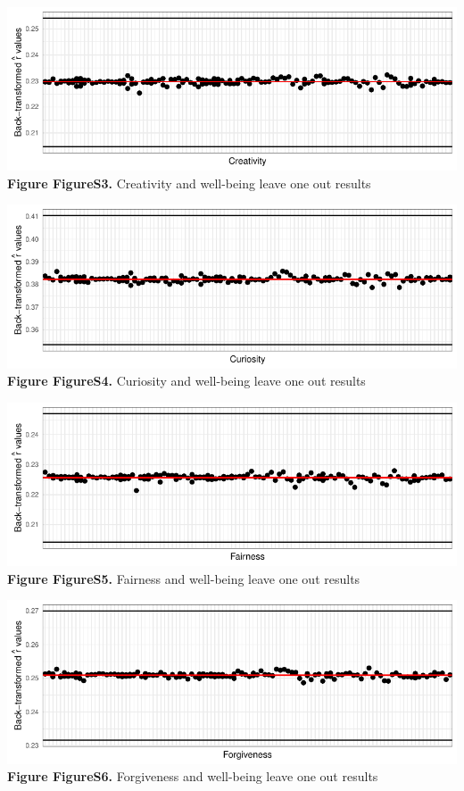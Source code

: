 \documentclass[
  letterpaper,
  DIV=11,
  numbers=noendperiod]{scrartcl}
\begin{document}
\includegraphics{SupplementaryResults_files/figure-pdf/unnamed-chunk-11-3.pdf}\textbf{Figure
FigureS3.} Creativity and well-being leave one out results

\includegraphics{SupplementaryResults_files/figure-pdf/unnamed-chunk-11-4.pdf}\textbf{Figure
FigureS4.} Curiosity and well-being leave one out results

\includegraphics{SupplementaryResults_files/figure-pdf/unnamed-chunk-11-5.pdf}\textbf{Figure
FigureS5.} Fairness and well-being leave one out results

\includegraphics{SupplementaryResults_files/figure-pdf/unnamed-chunk-11-6.pdf}\textbf{Figure
FigureS6.} Forgiveness and well-being leave one out results
\end{document}
